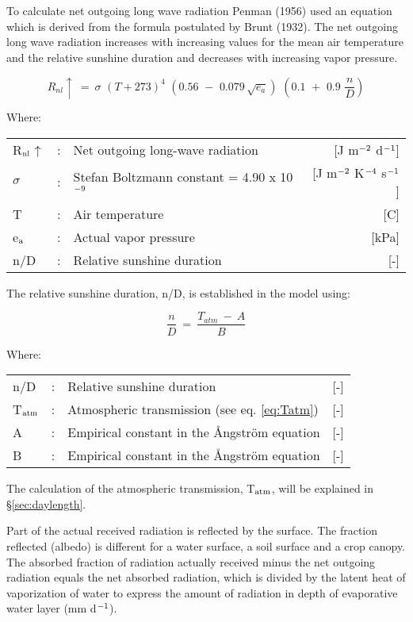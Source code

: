 To calculate net outgoing long wave radiation Penman (1956) used an equation which is
derived from the formula postulated by Brunt (1932). The net outgoing long wave
radiation increases with increasing values for the mean air temperature and the relative
sunshine duration and decreases with increasing vapor pressure.

\begin{equation}
R _{nl} \uparrow  ~=~ \sigma \,\, (T+273) ^{4} \,\, (0.56\,\, -\,\, 0.079\, \sqrt{e _{a} } )\,\, (0.1\,\, +\,\, 0.9\,\,{\frac{n}{D}} )
\end{equation}


Where:\\[5pt]
\begin{tabularx}{\textwidth}{llXr}
	R$_{{\rm nl}}$$\uparrow$ &:& Net outgoing long-wave radiation & [J m$^{{\rm -2}}$ d$^{{\rm -1}}$]\\
	$\sigma$ &:& Stefan Boltzm\-ann constant = 4.90 x 10$^{{\rm -9}}$ & [J m$^{{\rm -2}}$ K$^{{\rm -4}}$ s$^{{\rm -1}}$]\\
	T &:& Air temperature & [\textdegree C]\\
	e$_{{\rm a}}$ &:& Actual vapor pressure & [kPa]\\
	n/D &:& Relative sunshine duration & [-]\\
\end{tabularx}

The relative sunshine duration, n/D, is established in the model using:

\begin{equation}
{\frac{n}{D}} ~=~{\frac{T_{atm} ~-~A}{B}}
\end{equation}

Where:\\[5pt]
\begin{tabularx}{\textwidth}{llXr}
	n/D &:& Relative sunshine duration  & [-]\\
	T$_{{\rm atm}}$ &:& Atmospheric transmission (see eq. \ref{eq:Tatm})  & [-]\\
	A &:& Empirical constant in the \AA ngstr\"{o}m equation  & [-]\\
	B &:& Empirical constant in the \AA ngstr\"{o}m equation  & [-]\\
\end{tabularx}


The calculation of the atmospheric transmission, T$_{{\rm atm}}$, will be explained in 
\S \ref{sec:daylength}.

Part of the actual received radiation is reflected by the surface. The fraction reflected
(albedo) is different for a water surface, a soil surface and a crop canopy. The absorbed
fraction of radiation actually received minus the net outgoing radiation equals the net
absorbed radiation, which is divided by the latent heat of vaporization of water to express
the amount of radiation in depth of evaporative water layer (mm d$^{{\rm -1}}$).

